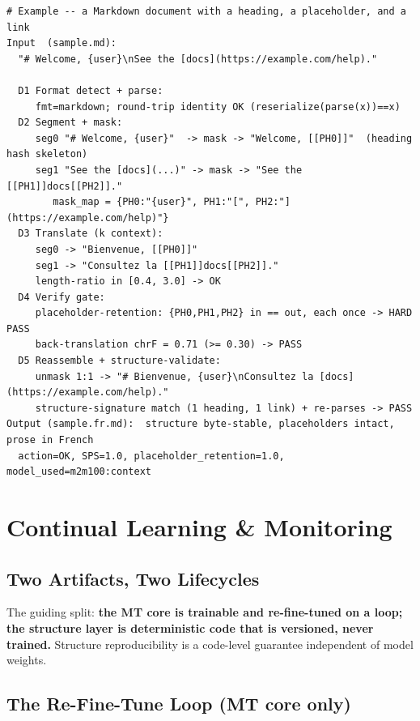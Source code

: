 \documentclass[12pt,a4paper]{article}
\begin{document}
\begin{lstlisting}
# Example -- a Markdown document with a heading, a placeholder, and a link
Input  (sample.md):
  "# Welcome, {user}\nSee the [docs](https://example.com/help)."

  D1 Format detect + parse:
     fmt=markdown; round-trip identity OK (reserialize(parse(x))==x)
  D2 Segment + mask:
     seg0 "# Welcome, {user}"  -> mask -> "Welcome, [[PH0]]"  (heading hash skeleton)
     seg1 "See the [docs](...)" -> mask -> "See the [[PH1]]docs[[PH2]]."
        mask_map = {PH0:"{user}", PH1:"[", PH2:"](https://example.com/help)"}
  D3 Translate (k context):
     seg0 -> "Bienvenue, [[PH0]]"
     seg1 -> "Consultez la [[PH1]]docs[[PH2]]."
     length-ratio in [0.4, 3.0] -> OK
  D4 Verify gate:
     placeholder-retention: {PH0,PH1,PH2} in == out, each once -> HARD PASS
     back-translation chrF = 0.71 (>= 0.30) -> PASS
  D5 Reassemble + structure-validate:
     unmask 1:1 -> "# Bienvenue, {user}\nConsultez la [docs](https://example.com/help)."
     structure-signature match (1 heading, 1 link) + re-parses -> PASS
Output (sample.fr.md):  structure byte-stable, placeholders intact, prose in French
  action=OK, SPS=1.0, placeholder_retention=1.0, model_used=m2m100:context
\end{lstlisting}

\section{Continual Learning \& Monitoring}

\subsection{Two Artifacts, Two Lifecycles}

The guiding split: \textbf{the MT core is trainable and re-fine-tuned on a loop; the structure layer is deterministic code that is versioned, never trained.} Structure reproducibility is a code-level guarantee independent of model weights.

\subsection{The Re-Fine-Tune Loop (MT core only)}
\end{document}
